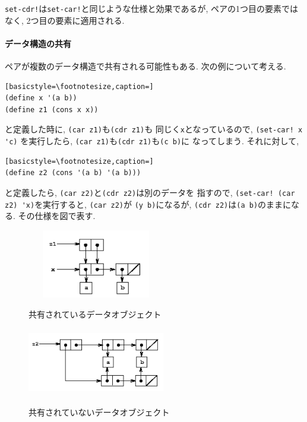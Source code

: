 \lstinline{set-cdr!}は\lstinline{set-car!}と同じような仕様と効果であるが,
ペアの1つ目の要素ではなく, 2つ目の要素に適用される.

\paragraph{データ構造の共有} ペアが複数のデータ構造で共有される可能性もある.
次の例について考える.

\begin{lstlisting}[basicstyle=\footnotesize,caption=]
(define x '(a b))
(define z1 (cons x x))
\end{lstlisting}

と定義した時に, \lstinline{(car z1)}も\lstinline{(cdr z1)}も
同じく\lstinline{x}となっているので, \lstinline{(set-car! x 'c)}
を実行したら, \lstinline{(car z1)}も\lstinline{(cdr z1)}も\lstinline{(c b)}に
なってしまう. それに対して,

\begin{lstlisting}[basicstyle=\footnotesize,caption=]
(define z2 (cons '(a b) '(a b)))
\end{lstlisting}

と定義したら, \lstinline{(car z2)}と\lstinline{(cdr z2)}は別のデータを
指すので, \lstinline{(set-car! (car z2) 'x)}を実行すると, \lstinline{(car z2)}が
\lstinline{(y b)}になるが, \lstinline{(cdr z2)}は\lstinline{(a b)}のままになる.
その仕様を図で表す.

\begin{figure}[b]
  \begin{minipage}{0.48\linewidth}
    \centering
    \includegraphics[height=3cm,width=6cm]{imgs/shared_pair.png}
    \caption{\label{fig:shared-pair}共有されているデータオブジェクト}
  \end{minipage}
  \begin{minipage}{0.48\linewidth}
    \centering
    \includegraphics[height=3cm,width=6cm]{imgs/not_shared_pair.png}
    \caption{\label{fig:not-shared-pair}共有されていないデータオブジェクト}
  \end{minipage}
\end{figure}